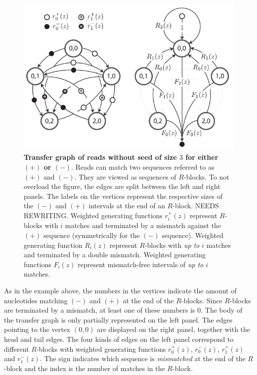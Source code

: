 \documentclass{article}
\begin{document}
\begin{figure}[h]
\centering
\includegraphics[scale=1]{false_positives_graph.pdf}
\caption{\textbf{Transfer graph of reads without seed of size $3$ for
either $(+)$ or $(-)$}. Reads can match two sequences referred to as $(+)$
and $(-)$. They are viewed as sequences of $R$-blocks. To not overload the
figure, the edges are split between the left and right panels. The labels
on the vertices represent the respective sizes of the $(-)$ and $(+)$
intervals at the end of an $R$-block. NEEDS REWRITING. Weighted generating
functions $r_i^+(z)$ represent $R$-blocks with $i$ matches and terminated
by a mismatch against the $(+)$ sequence (symmetrically for the $(-)$
sequence). Weighted generating function $R_i(z)$ represent $R$-blocks with
\emph{up to} $i$ matches and terminated by a double mismatch. Weighted
generating functions $F_i(z)$ represent mismatch-free intervals of
\emph{up to} $i$ matches.}
\label{fig:graph_fp}
\end{figure}

As in the example above, the numbers in the vertices indicate the amount
of nucleotides matching $(-)$ and $(+)$ at the end of the $R$-blocks.
Since $R$-blocks are terminated by a mismatch, at least one of these
numbers is $0$. The body of the transfer graph is only partially
represented on the left panel. The edges pointing to the vertex $(0,0)$
are displayed on the right panel, together with the head and tail edges.
The four kinds of edges on the left panel correspond to different
$R$-blocks with weighted generating functions $r_0^+(z)$, $r_0^-(z)$,
$r_1^+(z)$ and $r_1^-(z)$. The sign indicates which sequence is
\emph{mismatched} at the end of the $R$-block and the index is the number
of matches in the $R$-block.
\end{document}
